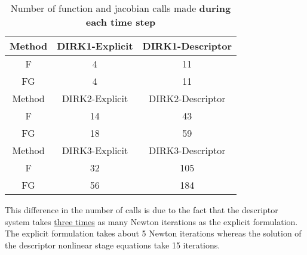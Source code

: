 \documentclass[pdftex,11pt,letter]{article}
\begin{document}
\begin{table}[h]
\caption{Number of function and jacobian calls made \textbf{during each time step}}
\medskip
\centering 
\begin{tabular}{c | c c}
\hline
Method & DIRK1-Explicit & DIRK1-Descriptor  \\
\hline
F  & 4  & 11\\
FG & 4  & 11\\ 
\hline
Method & DIRK2-Explicit & DIRK2-Descriptor  \\
\hline
F  & 14 & 43 \\
FG & 18 & 59 \\ 
\hline
Method & DIRK3-Explicit & DIRK3-Descriptor  \\
\hline
F  & 32 & 105 \\
FG & 56 & 184 \\ 
\hline
\end{tabular}
\label{tab:com_cost}
\end{table}
This difference in the number of calls is due to the fact that the
descriptor system takes \underline{three times} as many Newton
iterations as the explicit formulation. The explicit formulation takes
about 5 Newton iterations whereas the solution of the descriptor
nonlinear stage equations take 15 iterations.
\end{document}
